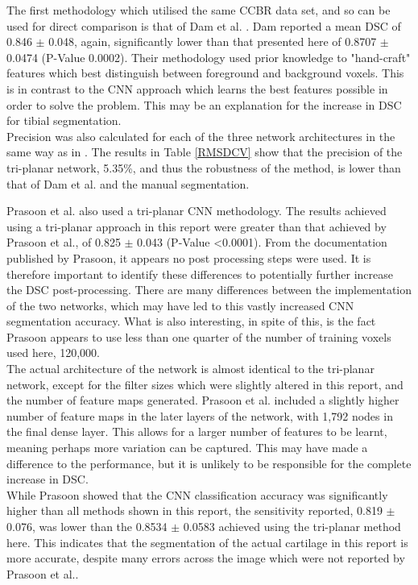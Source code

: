 \documentclass[11pt,a4paper]{memoir}
\numberwithin{figure}{section}
\numberwithin{table}{section}
\numberwithin{equation}{section}
\begin{document}
The first methodology which utilised the same CCBR data set, and so can be used for direct comparison is that of Dam et al. \cite{Dam2015}. Dam reported a mean DSC of 0.846 $\pm$ 0.048, again, significantly lower than that presented here of 0.8707 $\pm$ 0.0474 (P-Value 0.0002). Their methodology used prior knowledge to "hand-craft" features which best distinguish between foreground and background voxels. This is in contrast to the CNN approach which learns the best features possible in order to solve the problem. This may be an explanation for the increase in DSC for tibial segmentation.  \\ 

Precision was also calculated for each of the three network architectures in the same way as in \cite{Dam2015}. The results in  Table \ref{RMSDCV} show that the precision of the tri-planar network, 5.35\%, and thus the robustness of the method, is lower than that of Dam et al. and the manual segmentation.

Prasoon et al. \cite{Prasoon2013DeepNetwork} also used a tri-planar CNN methodology. The results achieved using a tri-planar approach in this report were greater than that achieved by Prasoon et al., of 0.825 $\pm$ 0.043 (P-Value \textless 0.0001). From the documentation published by Prasoon, it appears no post processing steps were used. It is therefore important to identify these differences to potentially further increase the DSC post-processing. There are many differences between the implementation of the two networks, which may have led to this vastly increased CNN segmentation accuracy. What is also interesting, in spite of this, is the fact Prasoon appears to use less than one quarter of the number of training voxels used here, 120,000. \\

The actual architecture of the network is almost identical to the tri-planar network, except for the filter sizes which were slightly altered in this report, and the number of feature maps generated. Prasoon et al. included a slightly higher number of feature maps in the later layers of the network, with 1,792 nodes in the final dense layer. This allows for a larger number of features to be learnt, meaning perhaps more variation can be captured. This may have made a difference to the performance, but it is unlikely to be responsible for the complete increase in DSC. \\

While Prasoon showed that the CNN classification accuracy was significantly higher than all methods shown in this report, the sensitivity reported, 0.819 $\pm$ 0.076, was lower than the 0.8534 $\pm$ 0.0583 achieved using the tri-planar method here. This indicates that the segmentation of the actual cartilage in this report is more accurate, despite many errors across the image which were not reported by Prasoon et al..\\
\end{document}
